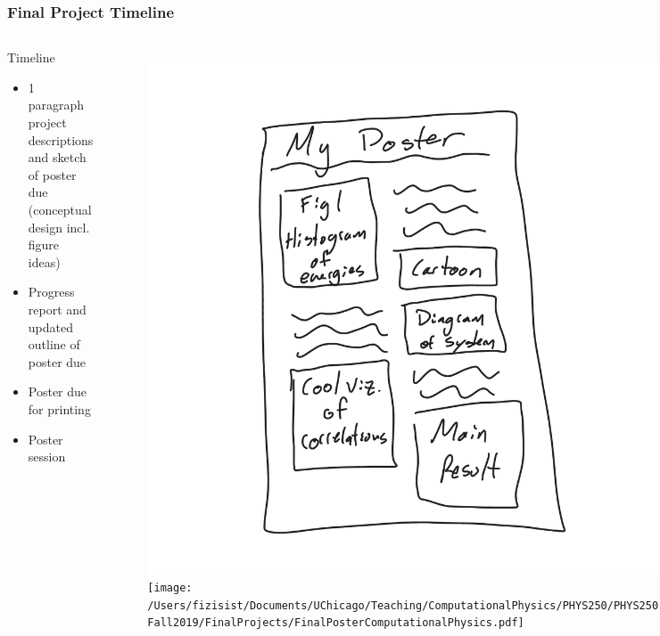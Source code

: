\documentclass[hyperref={colorlinks=true}]{beamer}
\begin{document}

\begin{frame}%
  \frametitle{Final Project Timeline}

  \begin{columns}
  
    
  \begin{ucblock}{Timeline}
    \begin{itemize}
      \item {} 1 paragraph project descriptions and sketch of poster due (conceptual design incl. figure ideas)
      \item {} Progress report and updated outline of poster due
      \item {} Poster due for printing
      \item {} Poster session
    \end{itemize}
  \end{ucblock}
  
  
  \vspace{-1cm}
  
  \begin{figure}
    \includegraphics[width=0.9\columnwidth]{PosterConcept.png}\\
    \texttt{[image: /Users/fizisist/Documents/UChicago/Teaching/ComputationalPhysics/PHYS250/PHYS250-Fall2019/FinalProjects/FinalPosterComputationalPhysics.pdf]}\\
  \end{figure}

  
  \end{columns}

  
\end{frame}
\end{document}
